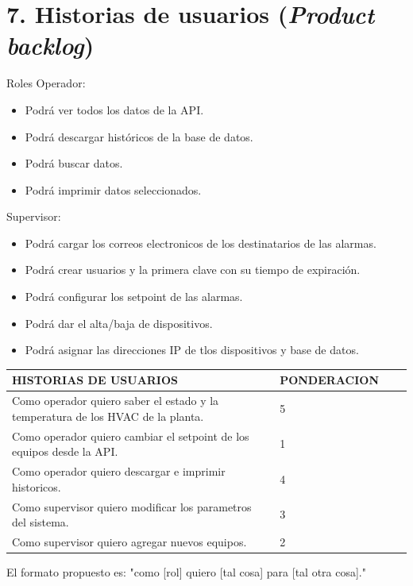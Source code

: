 \documentclass[
11pt, %
codirector, %
]{charter}
\begin{document}
\section{7. Historias de usuarios (\textit{Product backlog})}
\label{sec:backlog}
Roles
Operador:
\begin{itemize}
 \item Podrá ver todos los datos de la API. 
 \item Podrá descargar históricos de la base de datos.
 \item Podrá buscar datos.
 \item Podrá imprimir datos seleccionados.
\end{itemize}
Supervisor:
\begin{itemize}
\item Podrá cargar los correos electronicos de los destinatarios de las alarmas.
\item Podrá crear usuarios y la primera clave con su tiempo de expiración.
\item Podrá configurar los setpoint de las alarmas.
\item Podrá dar el alta/baja de dispositivos.
\item Podrá asignar las direcciones IP de tlos dispositivos y base de datos.
\end{itemize}


\begin{table}[ht]
\begin{tabularx}{\linewidth}{@{}|l|X|X|l|@{}}
\hline
\rowcolor[HTML]{C0C0C0} 
HISTORIAS DE USUARIOS & PONDERACION \\ \hline
Como operador quiero saber el estado y la temperatura de los HVAC de la planta.  &    5 \\ \hline
Como operador quiero cambiar el setpoint de los equipos desde la API.  & 1 \\ \hline
Como operador quiero descargar e imprimir historicos.      	& 4	\\ \hline
Como supervisor quiero modificar los parametros del sistema. 	&  3 \\ \hline
Como supervisor quiero agregar nuevos equipos.  &  2 	\\ \hline
\end{tabularx}
\end{table}





El formato propuesto es: "como [rol] quiero [tal cosa] para [tal otra cosa]."
\end{document}
